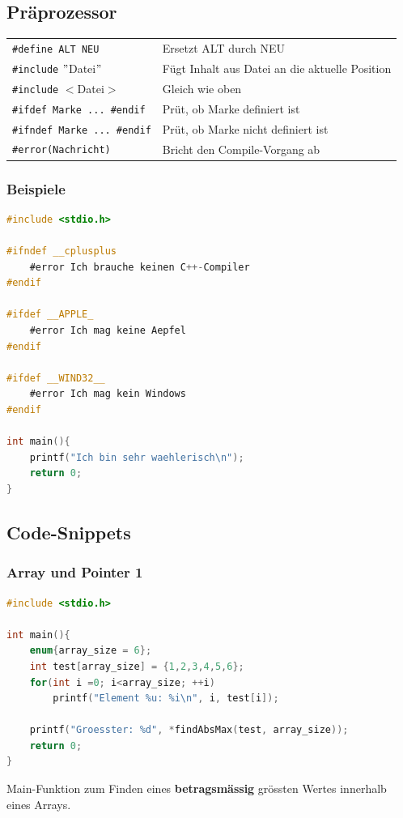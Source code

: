 	\subsection{Präprozessor}
		\begin{tabular}{ll}
			\verb|#define ALT NEU|  & Ersetzt ALT durch NEU \\
			\verb|#include| $"$Datei$"$ & Fügt Inhalt aus Datei an die aktuelle Position \\
			\verb|#include| $<$Datei$>$ & Gleich wie oben \\
			\verb|#ifdef Marke ... #endif| & Prüt, ob Marke definiert ist \\
			\verb|#ifndef Marke ... #endif| & Prüt, ob Marke nicht definiert ist \\
			\verb|#error(Nachricht)| & Bricht den Compile-Vorgang ab \\ 
		\end{tabular}

		\subsubsection{Beispiele}
			\begin{lstlisting}[language=C]
#include <stdio.h>

#ifndef __cplusplus
	#error Ich brauche keinen C++-Compiler
#endif

#ifdef __APPLE_
	#error Ich mag keine Aepfel
#endif

#ifdef __WIND32__
	#error Ich mag kein Windows
#endif

int main(){
	printf("Ich bin sehr waehlerisch\n");
	return 0;
}
			\end{lstlisting}

	\subsection{Code-Snippets}
		\subsubsection{Array und Pointer 1}
			\begin{lstlisting}[language=C]
#include <stdio.h>

int main(){
	enum{array_size = 6};
	int test[array_size] = {1,2,3,4,5,6};
	for(int i =0; i<array_size; ++i)
		printf("Element %u: %i\n", i, test[i]);
	
	printf("Groesster: %d", *findAbsMax(test, array_size));
	return 0;
}
			\end{lstlisting}
			Main-Funktion zum Finden eines \textbf{betragsmässig} grössten Wertes innerhalb eines Arrays.

